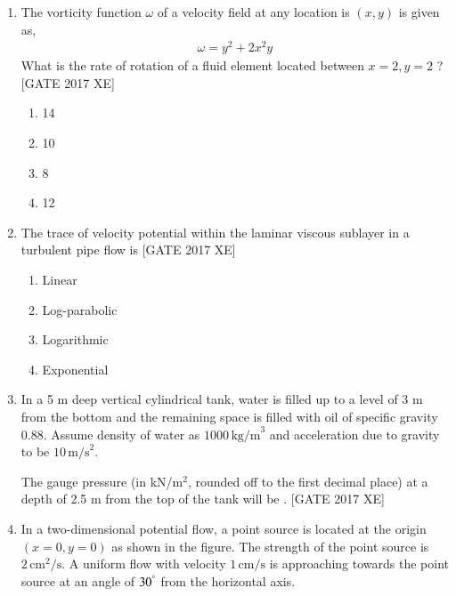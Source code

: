 \documentclass[journal,12pt,onecolumn]{IEEEtran}
\theoremstyle{remark}
\begin{document}
\begin{enumerate}
\item The vorticity function $\omega$ of a velocity field at any location is $(x,y)$ is given as,  
\begin{align}
\omega = y^2 + 2x^2 y
\end{align}
What is the rate of rotation of a fluid element located between $x=2,y=2$ ?  
\hfill [GATE 2017 XE]

\begin{multicols}{2}
\begin{enumerate}
    \item 14
    \item 10
    \item 8
    \item 12
\end{enumerate}
\end{multicols}

\item The trace of velocity potential within the laminar viscous sublayer in a turbulent pipe flow is  
\hfill [GATE 2017 XE]

\begin{multicols}{2}
\begin{enumerate}
    \item Linear
    \item Log-parabolic
    \item Logarithmic
    \item Exponential
\end{enumerate}
\end{multicols}

\item In a 5 m deep vertical cylindrical tank, water is filled up to a level of 3 m from the bottom and the remaining space is filled with oil of specific gravity 0.88.  
Assume density of water as $1000 \,\text{kg/m}^3$ and acceleration due to gravity to be $10 \,\text{m/s}^2$.  

The gauge pressure (in kN/m$^2$, rounded off to the first decimal place) at a depth of 2.5 m from the top of the tank will be \underline{\hspace{2cm}}.  
\hfill [GATE 2017 XE]

\item In a two-dimensional potential flow, a point source is located at the origin $(x = 0, y = 0)$ as shown in the figure.  
The strength of the point source is $2 \,\text{cm}^2/\text{s}$.  
A uniform flow with velocity $1 \,\text{cm/s}$ is approaching towards the point source at an angle of $30^\degree$ from the horizontal axis.  


\end{enumerate}
\end{document}
